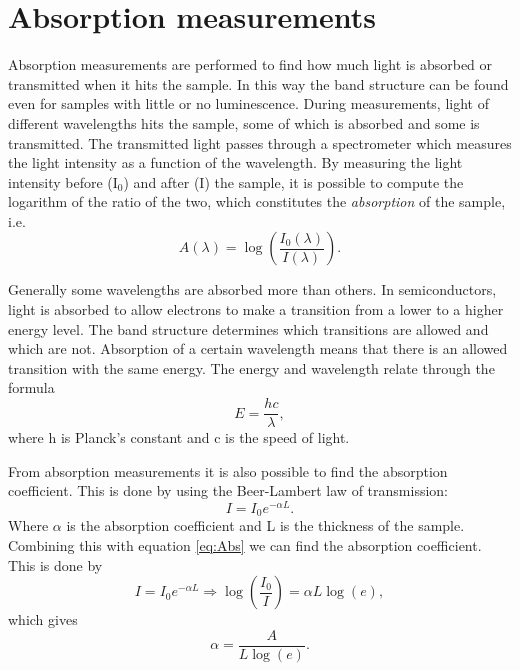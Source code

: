 	
\section{Absorption measurements}
\label{sec:absorption}
Absorption measurements are performed to find how much light is absorbed or transmitted when it hits the sample. In this way the band structure can be found even for samples with little or no luminescence. During measurements, light of different wavelengths  hits the sample, some of which is absorbed and some is transmitted. The transmitted light passes through a spectrometer which measures the light intensity as a function of the wavelength. By measuring the light intensity before (I$_0$) and after (I) the sample, it is possible to compute the logarithm of the ratio of the two, which constitutes the \emph{absorption} of the sample, i.e.
\begin{equation}
\label{eq:Abs}
A(\lambda) = \log\left(\frac{I_0(\lambda)}{I(\lambda)}\right).
\end{equation}


Generally some wavelengths are absorbed more than others. In semiconductors, light is absorbed to allow electrons to make a transition from a lower to a higher energy level. The band structure determines which transitions are allowed and which are not. Absorption of a certain wavelength means that there is an allowed transition with the same energy. The energy and wavelength relate through the formula
\begin{equation}
E = \frac{hc}{\lambda},
\end{equation}
where h is Planck's constant and c is the speed of light. 

From absorption measurements it is also possible to find the absorption coefficient. This is done by using the Beer-Lambert law of transmission:
\begin{equation}
\label{eq:BL}
I = I_0e^{-\alpha L}.
\end{equation}
Where $\alpha$ is the absorption coefficient and L is the thickness of the sample. Combining this with equation \ref{eq:Abs} we can find the absorption coefficient. This is done by
\[I=I_0e^{-\alpha L} \Longrightarrow \log\left(\frac{I_0}{I}\right)=\alpha L \log(e),\]
which gives
\begin{equation}
\label{eq:abs_coeff}
\alpha = \frac{A}{L\log(e)}.
\end{equation}

